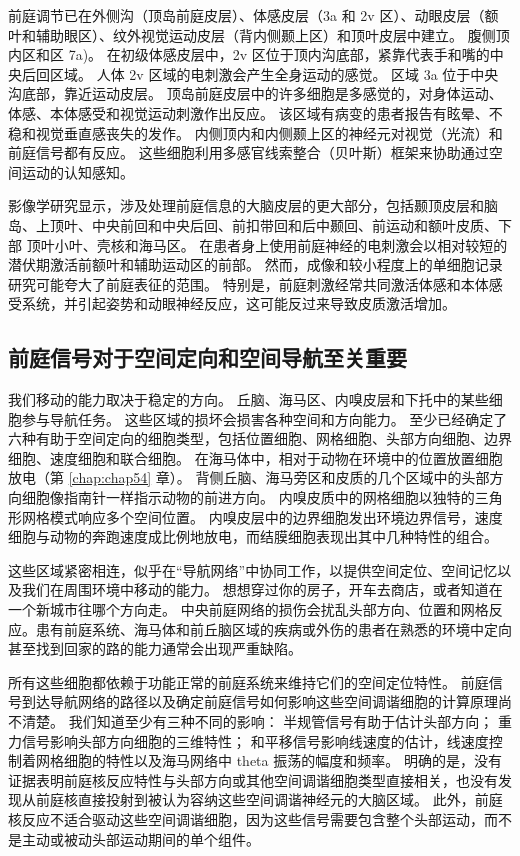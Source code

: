前庭调节已在外侧沟（顶岛前庭皮层）、体感皮层（3a 和 2v 区）、动眼皮层（额叶和辅助眼区）、纹外视觉运动皮层（背内侧颞上区）和顶叶皮层中建立。 腹侧顶内区和区 7a)。
在初级体感皮层中，2v 区位于顶内沟底部，紧靠代表手和嘴的中央后回区域。
人体 2v 区域的电刺激会产生全身运动的感觉。
区域 3a 位于中央沟底部，靠近运动皮层。
顶岛前庭皮层中的许多细胞是多感觉的，对身体运动、体感、本体感受和视觉运动刺激作出反应。
该区域有病变的患者报告有眩晕、不稳和视觉垂直感丧失的发作。
内侧顶内和内侧颞上区的神经元对视觉（光流）和前庭信号都有反应。
这些细胞利用多感官线索整合（贝叶斯）框架来协助通过空间运动的认知感知。


影像学研究显示，涉及处理前庭信息的大脑皮层的更大部分，包括颞顶皮层和脑岛、上顶叶、中央前回和中央后回、前扣带回和后中颞回、前运动和额叶皮质、下部 顶叶小叶、壳核和海马区。
在患者身上使用前庭神经的电刺激会以相对较短的潜伏期激活前额叶和辅助运动区的前部。
然而，成像和较小程度上的单细胞记录研究可能夸大了前庭表征的范围。
特别是，前庭刺激经常共同激活体感和本体感受系统，并引起姿势和动眼神经反应，这可能反过来导致皮质激活增加。


\subsection{前庭信号对于空间定向和空间导航至关重要}

我们移动的能力取决于稳定的方向。
丘脑、海马区、内嗅皮层和下托中的某些细胞参与导航任务。
这些区域的损坏会损害各种空间和方向能力。
至少已经确定了六种有助于空间定向的细胞类型，包括位置细胞、网格细胞、头部方向细胞、边界细胞、速度细胞和联合细胞。
在海马体中，相对于动物在环境中的位置放置细胞放电（第 \ref{chap:chap54} 章）。
背侧丘脑、海马旁区和皮质的几个区域中的头部方向细胞像指南针一样指示动物的前进方向。
内嗅皮质中的网格细胞以独特的三角形网格模式响应多个空间位置。
内嗅皮层中的边界细胞发出环境边界信号，速度细胞与动物的奔跑速度成比例地放电，而结膜细胞表现出其中几种特性的组合。


这些区域紧密相连，似乎在“导航网络”中协同工作，以提供空间定位、空间记忆以及我们在周围环境中移动的能力。
想想穿过你的房子，开车去商店，或者知道在一个新城市往哪个方向走。
中央前庭网络的损伤会扰乱头部方向、位置和网格反应。患有前庭系统、海马体和前丘脑区域的疾病或外伤的患者在熟悉的环境中定向甚至找到回家的路的能力通常会出现严重缺陷。


所有这些细胞都依赖于功能正常的前庭系统来维持它们的空间定位特性。
前庭信号到达导航网络的路径以及确定前庭信号如何影响这些空间调谐细胞的计算原理尚不清楚。
我们知道至少有三种不同的影响： 半规管信号有助于估计头部方向；
重力信号影响头部方向细胞的三维特性；
和平移信号影响线速度的估计，线速度控制着网格细胞的特性以及海马网络中 theta 振荡的幅度和频率。
明确的是，没有证据表明前庭核反应特性与头部方向或其他空间调谐细胞类型直接相关，也没有发现从前庭核直接投射到被认为容纳这些空间调谐神经元的大脑区域。
此外，前庭核反应不适合驱动这些空间调谐细胞，因为这些信号需要包含整个头部运动，而不是主动或被动头部运动期间的单个组件。


